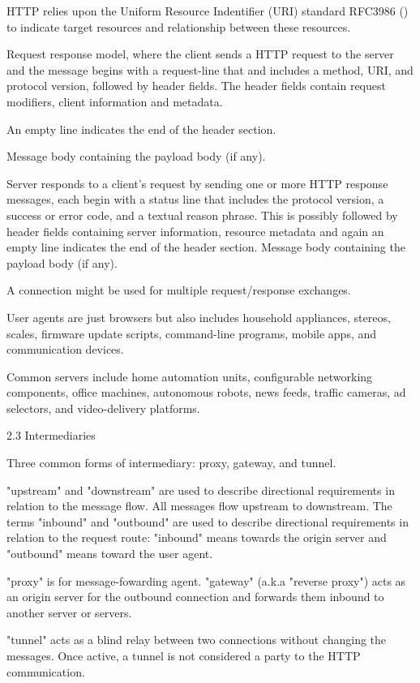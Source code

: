 \documentclass[12pt, a4paper]{article}
\begin{document}
HTTP relies upon the Uniform Resource Indentifier (URI) standard RFC3986 (\cite{rfc3986}) to indicate
target resources and relationship between these resources.

Request response model, where the client sends a HTTP request to the server and the message begins
with a request-line that and includes a method, URI, and protocol version, followed by header fields.
The header fields contain request modifiers, client information and metadata.

An empty line indicates the end of the header section.

Message body containing the payload body (if any).

Server responds to a client's request by sending one or more HTTP response messages, each begin with
a status line that includes the protocol version, a success or error code, and a textual reason
phrase. This is possibly followed by header fields containing server information, resource metadata
and again an empty line indicates the end of the header section. Message body containing the payload
body (if any).

A connection might be used for multiple request/response exchanges.

User agents are just browsers but also includes household appliances, stereos, scales, firmware
update scripts, command-line programs, mobile apps, and communication devices.

Common servers include home automation units, configurable networking components, office machines,
autonomous robots, news feeds, traffic cameras, ad selectors, and video-delivery platforms.

2.3 Intermediaries

Three common forms of intermediary: proxy, gateway, and tunnel.

"upstream" and "downstream" are used to describe directional requirements in relation to the
message flow. All messages flow upstream to downstream. The terms "inbound" and "outbound" are
used to describe directional requirements in relation to the request route: "inbound" means
towards the origin server and "outbound" means toward the user agent.

"proxy" is for message-fowarding agent.
"gateway" (a.k.a "reverse proxy") acts as an origin server for the outbound connection and
forwards them inbound to another server or servers.

"tunnel" acts as a blind relay between two connections without changing the messages.
Once active, a tunnel is not considered a party to the HTTP communication.
\end{document}

